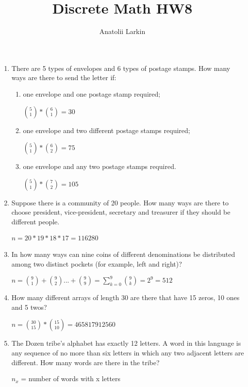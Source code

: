 \documentclass[12pt]{article}
\title{Discrete Math HW8}
\author{Anatolii Larkin}
\begin{document}
\maketitle


\begin{enumerate}



\item There are 5 types of envelopes and 6 types of postage stamps. How many ways are there to send the letter if:
    \begin{enumerate}
        \item[a)] one envelope and one postage stamp required;

        $\binom{5}{1} * \binom{6}{1} = 30  $
        
        \item[b)] one envelope and two different postage stamps required;

        $\binom{5}{1} * \binom{6}{2} = 75$
        
        \item[c)] one envelope and any two postage stamps required.

        $\binom{5}{1} * \binom{7}{2} = 105$
    \end{enumerate}

\item Suppose there is a community of 20 people. How many ways are there to
choose president, vice-president, secretary and treasurer if they should be
different people.

$n = 20 * 19 * 18 * 17 = 116280$


\item In how many ways can nine coins of different denominations be distributed
among two distinct pockets (for example, left and right)?

$n = \binom{9}{1} + \binom{9}{2}... + \binom{9}{9} = \sum_{k=0}^{9} \binom{9}{k} = 2^9 = 512$


\item How many different arrays of length 30 are there that have 15 zeros, 10 ones
and 5 twos?

$n = \binom{30}{15} * \binom{15}{10} = 465817912560$


\item The Dozen tribe’s alphabet has exactly 12 letters. A word in this language
is any sequence of no more than six letters in which any two adjacent letters
are different. How many words are there in the tribe?

$n_x$ = number of words with x letters


\end{enumerate}
\end{document}
